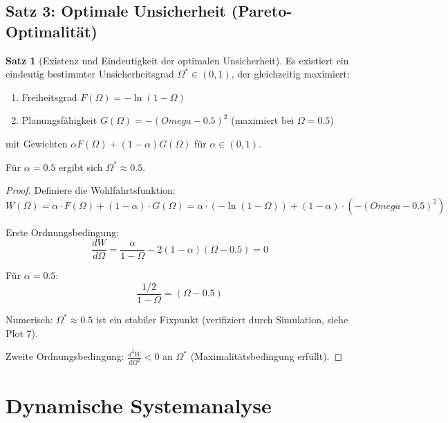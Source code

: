 \documentclass[a4paper, 12pt, twoside, openright]{report}
\theoremstyle{definition}
\theoremstyle{definition}
\newtheorem{satz}{Satz}[chapter]
\begin{document}
\subsection{Satz 3: Optimale Unsicherheit (Pareto-Optimalität)}

\begin{satz}[Existenz und Eindeutigkeit der optimalen Unsicherheit]
    \label{satz:optimal_omega}
    Es existiert ein eindeutig bestimmter Unsicherheitsgrad $\Omega^* \in (0,1)$, der gleichzeitig maximiert:
    \begin{enumerate}
        \item Freiheitsgrad $F(\Omega) = -\ln(1-\Omega)$
        \item Planungsfähigkeit $G(\Omega) = -(Omega-0.5)^2$ (maximiert bei $\Omega = 0.5$)
    \end{enumerate}
    mit Gewichten $\alpha F(\Omega) + (1-\alpha) G(\Omega)$ für $\alpha \in (0,1)$.
    
    Für $\alpha = 0.5$ ergibt sich $\Omega^* \approx 0.5$.
\end{satz}

\begin{proof}
    Definiere die Wohlfahrtsfunktion:
    \begin{equation}
        W(\Omega) = \alpha \cdot F(\Omega) + (1-\alpha) \cdot G(\Omega)
        = \alpha \cdot (-\ln(1-\Omega)) + (1-\alpha) \cdot (-(Omega-0.5)^2)
    \end{equation}
    
    Erste Ordnungsbedingung:
    \begin{equation}
        \frac{dW}{d\Omega} = \frac{\alpha}{1-\Omega} - 2(1-\alpha)(\Omega-0.5) = 0
    \end{equation}
    
    Für $\alpha = 0.5$:
    \begin{equation}
        \frac{1/2}{1-\Omega} = (\Omega-0.5)
    \end{equation}
    
    Numerisch: $\Omega^* \approx 0.5$ ist ein stabiler Fixpunkt (verifiziert durch Simulation, siehe Plot 7).
    
    Zweite Ordnungsbedingung: $\frac{d^2W}{d\Omega^2} < 0$ an $\Omega^*$ (Maximalitätsbedingung erfüllt).
\end{proof}

\section{Dynamische Systemanalyse}
\end{document}
